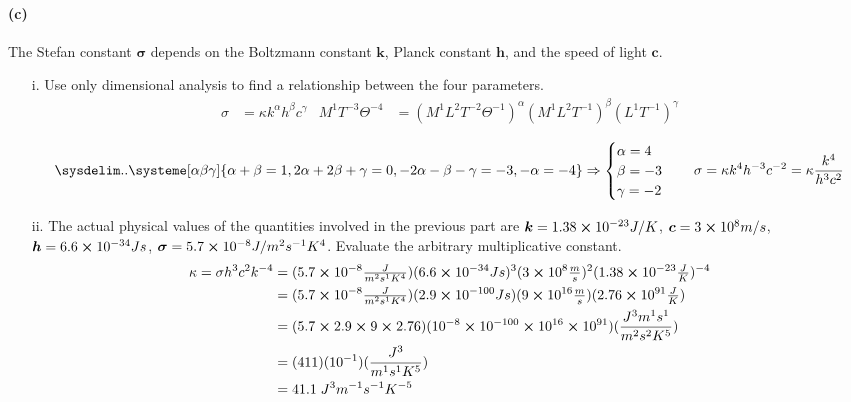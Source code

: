 \documentclass[]{article}
\begin{document}
{		\paragraph*{(c)} The Stefan constant $\bm{\sigma}$ depends on the Boltzmann constant $\bm{k}$, Planck constant $\bm{h}$, and the speed of light $\bm{c}$.
			\begin{enumerate}[label=\roman*,topsep=0pt]
				\item[i.] Use only dimensional analysis to find a relationship between the four parameters.
					\begin{equation*}
						\begin{aligned}
							\sigma &= \kappa k^{\alpha} h^{\beta} c^{\gamma} & M^1 T^{-3} \Theta^{-4} &= (M^1 L^2 T^{-2} \Theta^{-1})^{\alpha} (M^1 L^2 T^{-1})^{\beta} (L^1 T^{-1})^{\gamma}
							\\
						\end{aligned}
					\end{equation*}
					\begin{equation*}
						\sysdelim..\systeme[\alpha\beta\gamma]{
							\alpha + \beta = 1, 
							2\alpha + 2\beta + \gamma = 0,
							-2\alpha - \beta - \gamma = -3,
							-\alpha = -4
						} \Rightarrow
						\begin{cases}
							\alpha = 4 \\
							\beta = -3 \\
							\gamma = -2
						\end{cases}
						\quad
						\sigma = \kappa k^{4} h^{-3} c^{-2} = \kappa \frac{k^4}{h^3 c^2}
					\end{equation*}
				
				\item[ii.] The actual physical values of the quantities involved in the previous part are $ \bm{k} = 1.38 \cross 10^{-23} J/K $, $\bm{c} = 3 \cross 10^8 m/s $, $\bm{h} = 6.6 \cross 10^{-34} Js $, $\bm{\sigma} = 5.7 \cross 10^{-8} J/m^2 s^{-1} K^4$. Evaluate the arbitrary multiplicative constant.
					\begin{equation*}
						\begin{split}
							\kappa = \sigma h^3 c^2 k^{-4} &= (5.7 \cross 10^{-8} \tfrac{J}{m^2 s^1 K^4}) (6.6 \cross 10^{-34} Js)^3 (3 \cross 10^8 \tfrac{m}{s})^2 (1.38 \cross 10^{-23} \tfrac{J}{K})^{-4} \\
							&= (5.7 \cross 10^{-8} \tfrac{J}{m^2 s^1 K^4}) (2.9 \cross 10^{-100} Js) (9 \cross 10^{16} \tfrac{m}{s}) (2.76 \cross 10^{91} \tfrac{J}{K}) \\
							&= (5.7 \cross 2.9 \cross 9 \cross 2.76)(10^{-8} \cross 10^{-100} \cross 10^{16} \cross 10^{91}) (\frac{J^3 m^1 s^1}{m^2 s^2 K^5}) \\
							&= (411)(10^{-1})(\frac{J^3}{m^1 s^1 K^5}) \\
							&= 41.1 \; J^3 m^{-1} s^{-1} K^{-5} 
						\end{split}
					\end{equation*}
			\end{enumerate}
		

}
\end{document}
